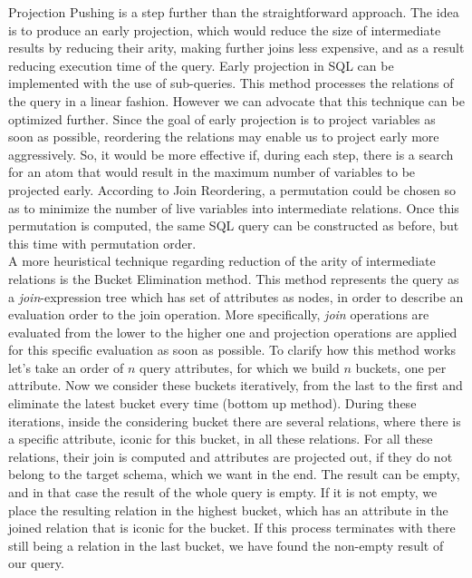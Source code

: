 Projection Pushing is a step further than the straightforward approach. The idea is to produce an early projection, which would reduce the size of intermediate results by reducing their arity, making further joins less expensive, and as a result reducing execution time of the query. Early projection in SQL can be implemented with the use of sub-queries. This method processes the relations of the query in a linear fashion. However we can advocate that this technique can be optimized further. Since the goal of early projection is to project variables as soon as possible, reordering the relations may enable us to project early more aggressively. So, it would be more effective if, during each step, there is a search for an atom that would result in the maximum number of variables to be projected early. According to Join Reordering, a permutation could be chosen so as to minimize the number of live variables into intermediate relations. Once this permutation is computed, the same SQL query can be constructed as before, but this time with permutation order. \\

A more heuristical technique regarding reduction of the arity of intermediate relations is the Bucket Elimination method. This method represents the query as a \textit{join}-expression tree which has set of attributes as nodes, in order to describe an evaluation order to the join operation. More specifically, \textit{join} operations are evaluated from the lower to the higher one and projection operations are applied for this specific evaluation as soon as possible. To clarify how this method works let's take an order of $n$ query attributes, for which we build $n$ buckets, one per attribute. Now we consider these buckets iteratively, from the last to the first and eliminate the latest bucket every time (bottom up method). During these iterations, inside the considering bucket there are several relations, where there is a specific attribute, iconic for this bucket, in all these relations. For all these relations, their join is computed and attributes are projected out, if they do not belong to the target schema, which we want in the end. The result can be empty, and in that case the result of the whole query is empty. If it is not empty, we place the resulting relation in the highest bucket, which has an attribute in the joined relation that is iconic for the bucket. If this process terminates with there still being a relation in the last bucket, we have found the non-empty result of our query.